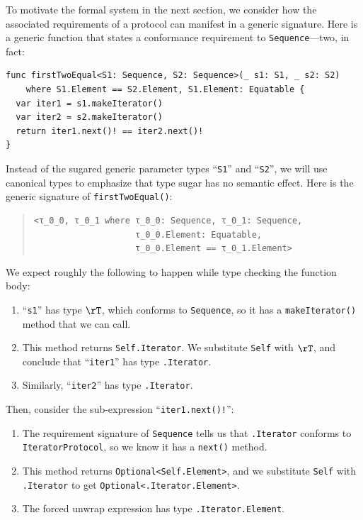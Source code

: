 \documentclass[../generics]{subfiles}
\begin{document}
\begin{example}\label{motivating derived reqs}
To motivate the formal system in the next section, we consider how the associated requirements of a protocol can manifest in a generic signature. Here is a generic function that states a conformance requirement to \texttt{Sequence}---two, in fact:
\begin{Verbatim}
func firstTwoEqual<S1: Sequence, S2: Sequence>(_ s1: S1, _ s2: S2)
    where S1.Element == S2.Element, S1.Element: Equatable {
  var iter1 = s1.makeIterator()
  var iter2 = s2.makeIterator()
  return iter1.next()! == iter2.next()!
}
\end{Verbatim}
Instead of the sugared generic parameter types ``\texttt{S1}'' and ``\texttt{S2}'', we will use canonical types to emphasize that type sugar has no semantic effect. Here is the generic signature of \texttt{firstTwoEqual()}:
\begin{quote}
\begin{verbatim}
<τ_0_0, τ_0_1 where τ_0_0: Sequence, τ_0_1: Sequence,
                    τ_0_0.Element: Equatable,
                    τ_0_0.Element == τ_0_1.Element>
\end{verbatim}
\end{quote}
We expect roughly the following to happen while type checking the function body:
\begin{enumerate}
\item ``\texttt{s1}'' has type $\rT$, which conforms to \texttt{Sequence}, so it has a \texttt{makeIterator()} method that we can call.
\item This method returns \texttt{Self.Iterator}. We substitute \texttt{Self} with $\rT$, and conclude that ``\texttt{iter1}'' has type \texttt{\rT.Iterator}.
\item Similarly, ``\texttt{iter2}'' has type \texttt{\rU.Iterator}.
\end{enumerate}
Then, consider the sub-expression ``\verb|iter1.next()!|'':
\begin{enumerate}
\item The requirement signature of \texttt{Sequence} tells us that \texttt{\rT.Iterator} conforms to \texttt{IteratorProtocol}, so we know it has a \texttt{next()} method.
\item This method returns \texttt{Optional<Self.Element>}, and we substitute \texttt{Self} with \texttt{\rT.Iterator} to get \texttt{Optional<\rT.Iterator.Element>}.
\item The forced unwrap expression has type \texttt{\rT.Iterator.Element}. 

\end{enumerate}
\end{example}
\end{document}
